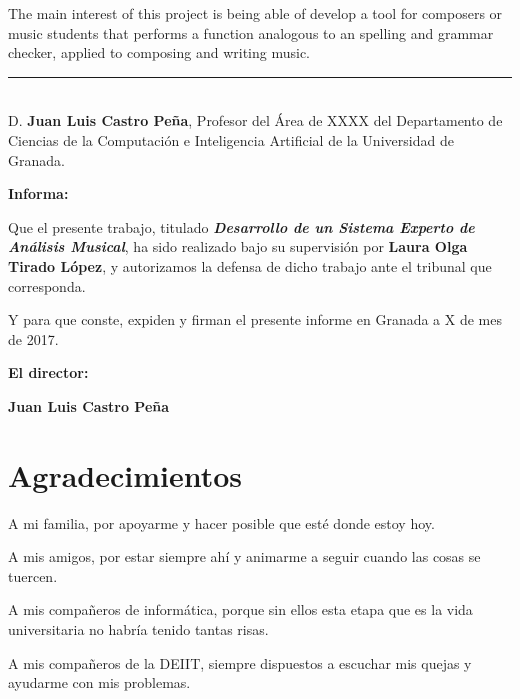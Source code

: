 \bigskip

The main interest of this project is being able of develop a tool for composers or music students that performs a function analogous to an spelling and grammar checker, applied to composing and writing music. 

\newpage
\thispagestyle{empty}

\noindent\rule[-1ex]{\textwidth}{2pt}\\[4.5ex]

D. \textbf{Juan Luis Castro Peña}, Profesor del Área de XXXX del Departamento de Ciencias de la Computación e Inteligencia Artificial de la Universidad de Granada.

\vspace{0.5cm}

\textbf{Informa:}

\vspace{0.5cm}

Que el presente trabajo, titulado \textit{\textbf{Desarrollo de un Sistema Experto de Análisis Musical}},
ha sido realizado bajo su supervisión por \textbf{Laura Olga Tirado López}, y autorizamos la defensa de dicho trabajo ante el tribunal que corresponda.

\vspace{0.5cm}

Y para que conste, expiden y firman el presente informe en Granada a X de mes de 2017.

\vspace{1cm}

\textbf{El director:}

\vspace{5cm}

\noindent \textbf{Juan Luis Castro Peña}

\chapter*{Agradecimientos}
\thispagestyle{empty}

       \vspace{1cm}

\bigskip
A mi familia, por apoyarme y hacer posible que esté donde estoy hoy.

\bigskip
A mis amigos, por estar siempre ahí y animarme a seguir cuando las cosas se tuercen.

\bigskip
A mis compañeros de informática, porque sin ellos esta etapa que es la vida universitaria no habría tenido tantas risas.

\bigskip
A mis compañeros de la DEIIT, siempre dispuestos a escuchar mis quejas y ayudarme con mis problemas.